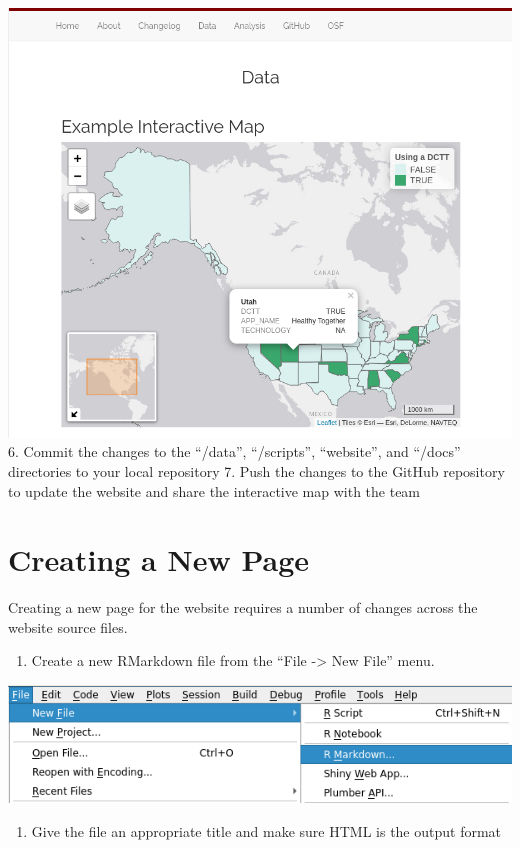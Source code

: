\documentclass[
]{book}
\providecommand{\tightlist}{%
  \setlength{\itemsep}{0pt}\setlength{\parskip}{0pt}}
\begin{document}
\includegraphics{images/04-example2_4.png}
6. Commit the changes to the ``/data'', ``/scripts'', ``website'', and ``/docs'' directories to your local repository
7. Push the changes to the GitHub repository to update the website and share the interactive map with the team

\hypertarget{creating-a-new-page}{%
\section{Creating a New Page}\label{creating-a-new-page}}

Creating a new page for the website requires a number of changes across the website source files.

\begin{enumerate}
\def\labelenumi{\arabic{enumi}.}
\tightlist
\item
  Create a new RMarkdown file from the ``File -\textgreater{} New File'' menu.
\end{enumerate}

\includegraphics{images/04-newpage_1.png}

\begin{enumerate}
\def\labelenumi{\arabic{enumi}.}
\setcounter{enumi}{1}
\tightlist
\item
  Give the file an appropriate title and make sure HTML is the output format
\end{enumerate}
\end{document}
